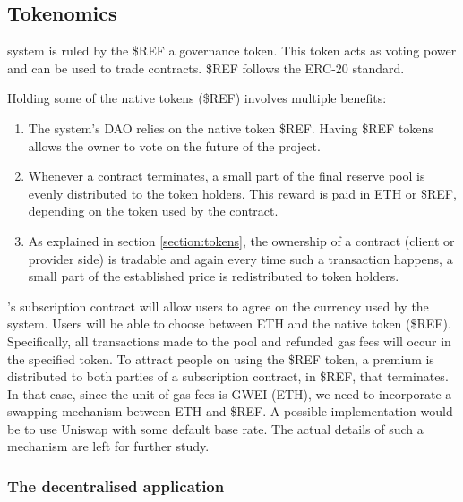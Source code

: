 \subsection{Tokenomics} \label{section:tokenomics}

{\projectName} system is ruled by the \$REF a governance token. This token acts as voting power and can be used to trade contracts. \$REF follows the ERC-20 standard. 

Holding some of the native tokens (\$REF) involves multiple benefits: 
\begin{enumerate}
    \item The system's DAO relies on the native token \$REF. Having \$REF tokens allows the owner to vote on the future of the project.
    \item Whenever a contract terminates, a small part of the final reserve pool is evenly distributed to the token holders. This reward is paid in ETH or \$REF, depending on the token used by the contract. 
    \item As explained in section \ref{section:tokens}, the ownership of a contract (client or provider side) is tradable and again every time such a transaction happens, a small part of the established price is redistributed to token holders. 
\end{enumerate}

{\projectName}'s subscription contract will allow users to agree on the currency used by the system. Users will be able to choose between ETH and the {\projectName} native token (\$REF). Specifically, all transactions made to the pool and refunded gas fees will occur in the specified token. To attract people on using the \$REF token, a premium is distributed to both parties of a subscription contract, in \$REF, that terminates. In that case, since the unit of gas fees is GWEI (ETH), we need to incorporate a swapping mechanism between ETH and \$REF. A possible implementation would be to use Uniswap with some default base rate. The actual details of such a mechanism are left for further study.


\subsubsection{The {\projectName} decentralised application}

